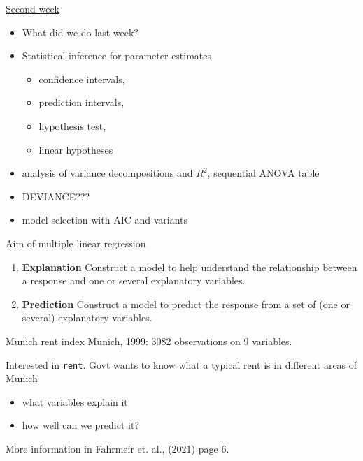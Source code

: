 \documentclass[
  ignorenonframetext,
]{beamer}
\providecommand{\tightlist}{%
  \setlength{\itemsep}{0pt}\setlength{\parskip}{0pt}}
\begin{document}
\begin{frame}
\begin{block}{\hyperlink{secondweek}{Second week}}
\label{second-week}
\begin{itemize}
\tightlist
\item
  What did we do last week?
\item
  Statistical inference for parameter estimates

  \begin{itemize}
  \tightlist
  \item
    confidence intervals,
  \item
    prediction intervals,
  \item
    hypothesis test,
  \item
    linear hypotheses
  \end{itemize}
\item
  analysis of variance decompositions and \(R^2\), sequential ANOVA
  table
\item
  DEVIANCE???
\item
  model selection with AIC and variants
\end{itemize}
\end{block}
\end{frame}

\begin{frame}{Aim of multiple linear regression}
\label{aim-of-multiple-linear-regression}
\begin{enumerate}
\item
  \textbf{Explanation} Construct a model to help understand the
  relationship between a response and one or several explanatory
  variables.
\item
  \textbf{Prediction} Construct a model to predict the response from a
  set of (one or several) explanatory variables.
\end{enumerate}
\end{frame}

\begin{frame}[fragile]
\begin{block}{Munich rent index}
\label{munich-rent-index}
Munich, 1999: 3082 observations on 9 variables.

Interested in \texttt{rent}. Govt wants to know what a typical rent is
in different areas of Munich

\begin{itemize}
\tightlist
\item
  what variables explain it
\item
  how well can we predict it?
\end{itemize}

More information in Fahrmeir et. al., (2021) page 6.
\end{block}
\end{frame}
\end{document}
